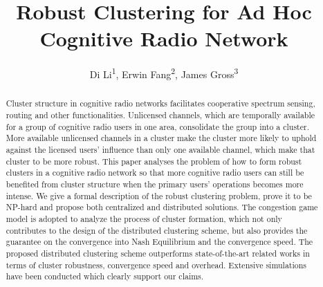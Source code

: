 \documentclass[times]{ettauth}
\theoremstyle{mytheoremstyle}
\theoremstyle{mytheoremstyle}
\theoremstyle{mytheoremstyle}
\begin{document}


\title{Robust Clustering for Ad Hoc Cognitive Radio Network}
\author{Di Li\textsuperscript{1}\corrauth, Erwin Fang\textsuperscript{2}, James Gross\textsuperscript{3}}
\address{RWTH Aachen University\textsuperscript{1}, Swisscom (Schweiz) AG\textsuperscript{2}, KTH Royal Institute of Technology\textsuperscript{3} }




\begin{abstract}
Cluster structure in cognitive radio networks facilitates cooperative spectrum sensing, routing and other functionalities.
Unlicensed channels, which are temporally available for a group of cognitive radio users in one area, consolidate the group into a cluster.
More available unlicensed channels in a cluster make the cluster more likely to uphold against the licensed users' influence than only one available channel, which make that cluster to be more robust.
This paper analyses the problem of how to form robust clusters in a cognitive radio network so that more cognitive radio users can still be benefited from cluster structure when the primary users' operations becomes more intense.
We give a formal description of the robust clustering problem, prove it to be NP-hard and propose both centralized and distributed solutions.
The congestion game model is adopted to analyze the process of cluster formation, which not only contributes to the design of the distributed clustering scheme, but also provides the guarantee on the convergence into Nash Equilibrium and the convergence speed.
The proposed distributed clustering scheme outperforms state-of-the-art related works in terms of cluster robustness, convergence speed and overhead.
Extensive simulations have been conducted which clearly support our claims.
\end{abstract}
\end{document}
